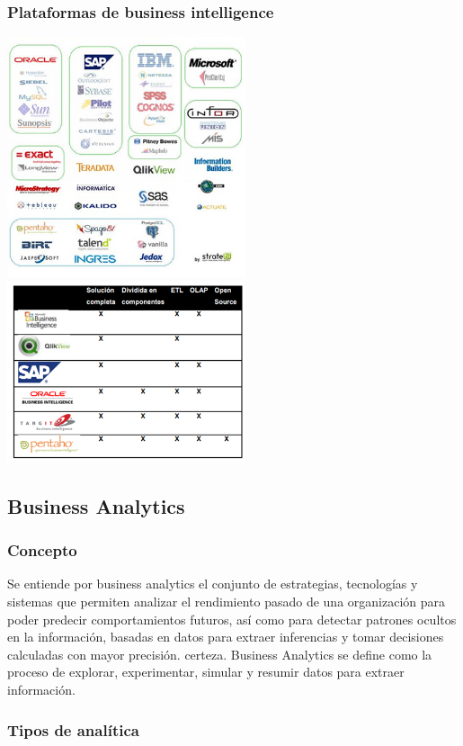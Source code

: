 \documentclass[twoside,twocolumn]{article}
\begin{document}
\subsubsection{Plataformas de business intelligence}
\includegraphics[width=7cm]{imagenes/plataformas.png}
\includegraphics[width=7cm]{imagenes/comparativa.png}

\subsection{Business Analytics}
\subsubsection{Concepto}
Se entiende por business analytics el conjunto de estrategias, tecnologías y sistemas que permiten analizar el rendimiento pasado de una organización para poder predecir comportamientos futuros, así como para detectar patrones ocultos en la información, basadas en datos para extraer inferencias y tomar decisiones calculadas con mayor precisión. certeza. Business Analytics se define como la proceso de explorar, experimentar, simular y resumir datos para extraer información.
\subsubsection{Tipos de analítica}
\end{document}
